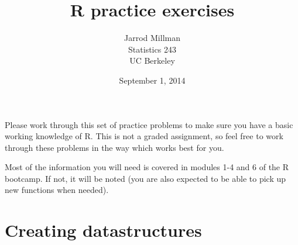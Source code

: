 \documentclass{article}
\title{R practice exercises}
\date{September 1, 2014}
\author{Jarrod Millman\\ Statistics 243\\ UC Berkeley}
\begin{document}
\maketitle

Please work through this set of practice problems to make sure you have a
basic working knowledge of R.  This is not a graded assignment,
so feel free to work through these problems in the way which works best
for you.

Most of the information you will need is covered in modules 1-4 and 6 of the R
bootcamp.  If not, it will be noted (you are also expected to be able to pick
up new functions when needed).


\section*{Creating datastructures}
\end{document}
